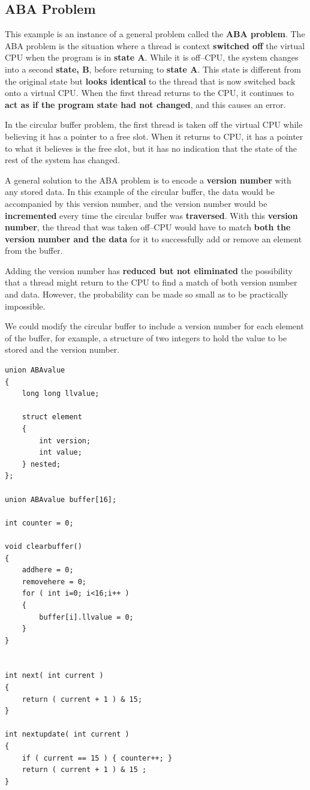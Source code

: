 \documentclass[12pt,a4paper]{report}
\begin{document}
\subsection{ABA Problem}
This example is an instance of a general problem called the \textbf{ABA problem}. The ABA problem is the situation where a thread is context \textbf{switched off} the virtual CPU when the program is in \textbf{state A}. While it is off--CPU, the system changes into a second\textbf{ state, B}, before returning to \textbf{state A}. This state is different from the original state but \textbf{looks identical} to the thread that is now switched back onto a virtual CPU. When the first thread returns to the CPU, it continues to \textbf{act as if the program state had not changed}, and this causes an error.
\par
In the circular buffer problem, the first thread is taken off the virtual CPU while believing it has a pointer to a free slot. When it returns to CPU, it has a pointer to what it believes is the free slot, but it has no indication that the state of the rest of the system has changed.
\par
A general solution to the ABA problem is to encode a \textbf{version number} with any stored data. In this example of the circular buffer, the data would be accompanied by this version number, and the version number would be \textbf{incremented} every time the circular buffer was \textbf{traversed}. With this \textbf{version number}, the thread that was taken off--CPU would have to match \textbf{both the version number and the data} for it to successfully add or remove an element from the buffer.
\par
Adding the version number has \textbf{reduced but not eliminated} the possibility that a thread might return to the CPU to find a match of both version number and data. However, the probability can be made so small as to be practically impossible.
\par
We could modify the circular buffer to include a version number for each element of the buffer, for example, a structure of two integers to hold the value to be stored and the version number. 
\begin{lstlisting}
union ABAvalue
{
	long long llvalue;
	
	struct element
	{
		int version;
		int value;
	} nested;
};

union ABAvalue buffer[16];

int counter = 0;

void clearbuffer()
{
	addhere = 0;
	removehere = 0;
	for ( int i=0; i<16;i++ )
	{
		buffer[i].llvalue = 0;
	}
}


int next( int current )
{
	return ( current + 1 ) & 15;
}

int nextupdate( int current )
{
	if ( current == 15 ) { counter++; }
	return ( current + 1 ) & 15 ;
}
\end{lstlisting}
\end{document}
